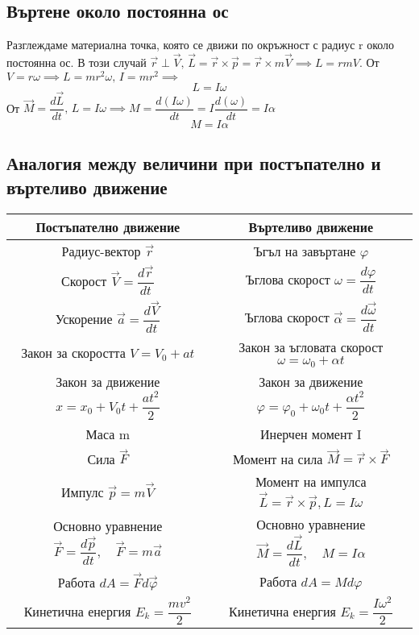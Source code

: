 \documentclass[fleqn, 12pt]{article}
\begin{document}
\subsection{Въртене около постоянна ос}
Разглеждаме материална точка, която се движи по окръжност с радиус r около постоянна ос. В този случай  $\vec{r} \perp \vec{V}, \, \vec{L} = \vec{r} \times \vec{p} = \vec{r} \times m\vec{V} \implies L = rmV $. От $V = r \omega \implies L =mr^2  \omega, \, I = mr^2 \implies $ 
$$L = I\omega$$
От $\vec{M} = \dfrac{d \vec{L}}{dt},\, L = I\omega \implies  M = \dfrac{d(I\omega)}{dt} = I \dfrac{d(\omega)}{dt} = I\alpha$
$$M = I\alpha $$

\subsection{Аналогия между величини при постъпателно и въртеливо движение}

\begin{center}
\begin{tabular}{ |c|c| } 
 \hline
 \textbf{Постъпателно движение} & \textbf{Въртеливо движение} \\ 
\hline
Радиус-вектор $\vec{r} $ & Ъгъл на завъртане $\varphi$ \\ 
\hline
 Скорост $\vec{V} = \dfrac{d \vec{r}}{dt}$ & Ъглова скорост  $\omega = \dfrac{d\varphi}{dt}$\\ 
 \hline
 Ускорение $\vec{a} = \dfrac{d \vec{V}}{dt}$ & Ъглова скорост  $\vec{\alpha} = \dfrac{d\vec{\omega}}{dt}$\\ 
 \hline
 Закон за скоростта $V = V_0 + at$ & Закон за ъгловата скорост $\omega = \omega_0 + \alpha t$ \\
\hline
Закон за движение $x = x_0 + V_0t + \dfrac{at^2}{2}$ & Закон за движение  $\varphi = \varphi_0 + \omega_0t + \dfrac{\alpha t^2}{2}$  \\
\hline
Маса m & Инерчен момент I\\
\hline
Сила $\vec{F}$ & Момент на сила $\vec{M} = \vec{r} \times \vec{F} $ \\
\hline
Импулс $\vec{p} = m\vec{V}$ & Момент на импулса $\vec{L} = \vec{r} \times \vec{p}, L = I\omega $\\
\hline
Основно уравнение $ \vec{F} = \dfrac{d \vec{p}}{dt}, \quad  \vec{F} = m\vec{a} $ & Основно уравнение $\vec{M} = \dfrac{d \vec{L}}{dt}, \quad  M = I\alpha$ \\
\hline
Работа $dA = \vec{F} d\vec{\varphi}$ & Работа $dA = Md\varphi$ \\
\hline
Кинетична енергия $E_k = \dfrac{mv^2}{2}$ &  Кинетична енергия $E_k = \dfrac{I \omega^2}{2}$\\
\hline
\end{tabular}
\end{center}
\end{document}
